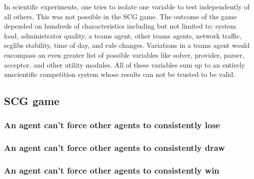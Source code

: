 \documentclass[letterpaper,12pt,oneside]{article}
\begin{document}
In scientific experiments, one tries to isolate one variable
to test independently of all others. This was not possible in the SCG game. The
outcome of the game depended on hundreds of characteristics including but not
limited to: system load, administrator quality, a teams agent, other teams
agents, network traffic, scglibs stability, time of day, and rule changes.
Variations in a teams agent would encompass an even greater list of possible
variables like solver, provider, parser, acceptor, and other utility modules.
All of these variables sum up to an entirely unscientific competition system
whose results can not be trusted to be valid.

\subsection{SCG game}

\subsubsection{An agent can't force other agents to consistently lose}
\subsubsection{An agent can't force other agents to consistently draw}
\subsubsection{An agent can't force other agents to consistently win}

% 
%
{}

\end{document}
